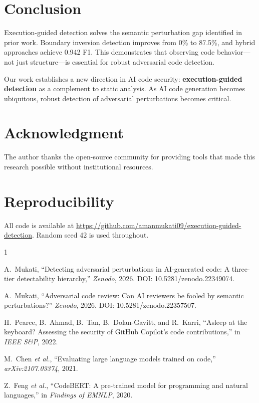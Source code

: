 \documentclass[conference]{IEEEtran}
\begin{document}
\section{Conclusion}
\label{sec:conclusion}

Execution-guided detection solves the semantic perturbation gap identified in prior work. Boundary inversion detection improves from 0\% to 87.5\%, and hybrid approaches achieve 0.942 F1. This demonstrates that observing code behavior---not just structure---is essential for robust adversarial code detection.

Our work establishes a new direction in AI code security: \textbf{execution-guided detection} as a complement to static analysis. As AI code generation becomes ubiquitous, robust detection of adversarial perturbations becomes critical.

\section*{Acknowledgment}

The author thanks the open-source community for providing tools that made this research possible without institutional resources.

\section*{Reproducibility}

All code is available at \url{https://github.com/amanmukati09/execution-guided-detection}. Random seed 42 is used throughout.


\begin{thebibliography}{1}

A.~Mukati, ``Detecting adversarial perturbations in AI-generated code: A three-tier detectability hierarchy,'' \emph{Zenodo}, 2026. DOI: 10.5281/zenodo.22349074.

A.~Mukati, ``Adversarial code review: Can AI reviewers be fooled by semantic perturbations?'' \emph{Zenodo}, 2026. DOI: 10.5281/zenodo.22357507.

H.~Pearce, B.~Ahmad, B.~Tan, B.~Dolan-Gavitt, and R.~Karri, ``Asleep at the keyboard? Assessing the security of GitHub Copilot's code contributions,'' in \emph{IEEE S\&P}, 2022.

M.~Chen \emph{et al.}, ``Evaluating large language models trained on code,'' \emph{arXiv:2107.03374}, 2021.

Z.~Feng \emph{et al.}, ``CodeBERT: A pre-trained model for programming and natural languages,'' in \emph{Findings of EMNLP}, 2020.

\end{thebibliography}
\end{document}
